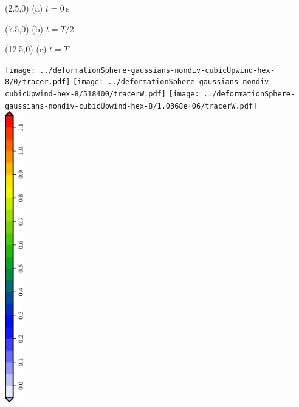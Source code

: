 \documentclass{article}
\begin{document}
\TPMargin{1pt}
\begin{textblock}{4}(2.5,0)
\normalsize
(a) $t=\SI{0}{\second}$
\end{textblock}
\begin{textblock}{4}(7.5,0)
\normalsize
(b) $t=T/2$
\end{textblock}
\begin{textblock}{4}(12.5,0)
\normalsize
(c) $t=T$
\end{textblock}
\vspace*{0.4em}
\texttt{[image: ../deformationSphere-gaussians-nondiv-cubicUpwind-hex-8/0/tracer.pdf]}
\hspace*{0.2em}
\texttt{[image: ../deformationSphere-gaussians-nondiv-cubicUpwind-hex-8/518400/tracerW.pdf]}
\hspace*{0.2em}
\texttt{[image: ../deformationSphere-gaussians-nondiv-cubicUpwind-hex-8/1.0368e+06/tracerW.pdf]} \\
\centering
\includegraphics[height=5in,angle=270]{deformationSphere-T-legend.eps}
\end{document}
